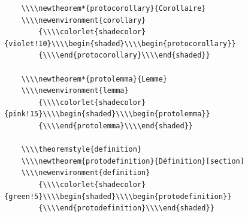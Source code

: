 \documentclass[french]{article}
\newtheorem*{protocorollary}{Corollaire}
\newtheorem*{protolemma}{Lemme}
\theoremstyle{definition}
\newtheorem{protodefinition}{Définition}[section]
\theoremstyle{remark}
\begin{document}
\begin{verbatim}
    \\\\newtheorem*{protocorollary}{Corollaire}
    \\\\newenvironment{corollary}
        {\\\\colorlet{shadecolor}{violet!10}\\\\begin{shaded}\\\\begin{protocorollary}}
        {\\\\end{protocorollary}\\\\end{shaded}}

    \\\\newtheorem*{protolemma}{Lemme}
    \\\\newenvironment{lemma}
        {\\\\colorlet{shadecolor}{pink!15}\\\\begin{shaded}\\\\begin{protolemma}}
        {\\\\end{protolemma}\\\\end{shaded}}

    \\\\theoremstyle{definition}
    \\\\newtheorem{protodefinition}{Définition}[section]
    \\\\newenvironment{definition}
        {\\\\colorlet{shadecolor}{green!5}\\\\begin{shaded}\\\\begin{protodefinition}}
        {\\\\end{protodefinition}\\\\end{shaded}}


\end{verbatim}
\end{document}
